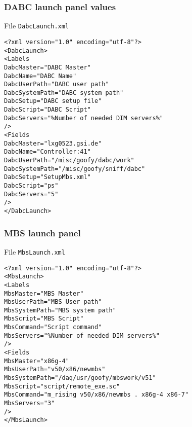\subsubsection{DABC launch panel values}
File {\tt DabcLaunch.xml}
\begin{verbatim}
<?xml version="1.0" encoding="utf-8"?>
<DabcLaunch>
<Labels
DabcMaster="DABC Master"
DabcName="DABC Name"
DabcUserPath="DABC user path"
DabcSystemPath="DABC system path"
DabcSetup="DABC setup file"
DabcScript="DABC Script"
DabcServers="%Number of needed DIM servers%"
/>
<Fields
DabcMaster="lxg0523.gsi.de"
DabcName="Controller:41"
DabcUserPath="/misc/goofy/dabc/work"
DabcSystemPath="/misc/goofy/sniff/dabc"
DabcSetup="SetupMbs.xml"
DabcScript="ps"
DabcServers="5"
/>
</DabcLaunch>
\end{verbatim}
\subsubsection{MBS launch panel}
File {\tt MbsLaunch.xml}
\begin{verbatim}
<?xml version="1.0" encoding="utf-8"?>
<MbsLaunch>
<Labels
MbsMaster="MBS Master"
MbsUserPath="MBS User path"
MbsSystemPath="MBS system path"
MbsScript="MBS Script"
MbsCommand="Script command"
MbsServers="%Number of needed DIM servers%"
/>
<Fields
MbsMaster="x86g-4"
MbsUserPath="v50/x86/newmbs"
MbsSystemPath="/daq/usr/goofy/mbswork/v51"
MbsScript="script/remote_exe.sc"
MbsCommand="m_rising v50/x86/newmbs . x86g-4 x86-7"
MbsServers="3"
/>
</MbsLaunch>
\end{verbatim}




